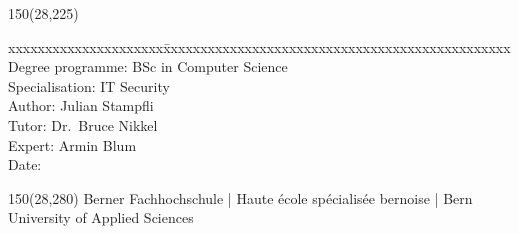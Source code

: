 \begin{titlepage}
\begin{flushleft}
\begin{textblock}{150}(28,225)
\fontsize{10pt}{17pt}\selectfont
\begin{tabbing}
xxxxxxxxxxxxxxxxxxxxx\=xxxxxxxxxxxxxxxxxxxxxxxxxxxxxxxxxxxxxxxxxxxxxxx \kill
Degree programme:	\> BSc in Computer Science	\\		%
Specialisation:	\> IT Security	\\		%
Author:		\> 		Julian Stampfli\\					%
Tutor:	\> Dr.~Bruce Nikkel		\\							%
Expert:		\> Armin Blum				\\							%
Date:			\> \versiondate					\\							%
\end{tabbing}

\end{textblock}
\end{flushleft}

\begin{textblock}{150}(28,280)
\noindent 
\color{bfhgrey}\fontsize{9pt}{10pt}\selectfont
Berner Fachhochschule | Haute \'ecole sp\'ecialis\'ee bernoise | Bern University of Applied Sciences
\color{black}\selectfont
\end{textblock}


\end{titlepage}

%
%
